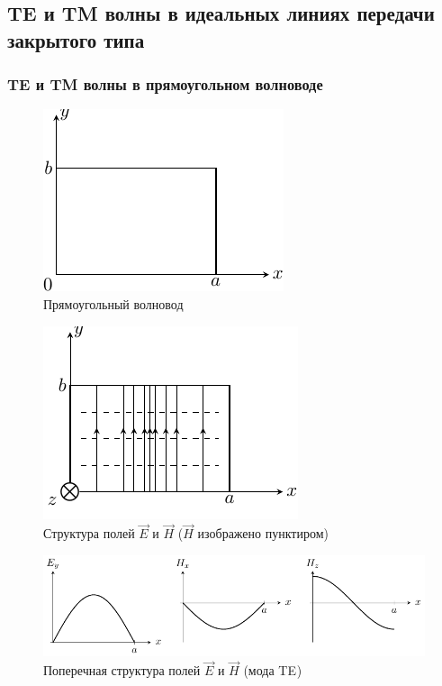 \subsection{TE и TM волны в идеальных линиях передачи закрытого типа}


\subsubsection{TE и TM волны в прямоугольном волноводе}

\begin{figure}[H]
	\centering
	\includegraphics[scale=1.5]{img/lect4_ris7}
	\caption{Прямоугольный волновод}
	\label{fig:lect4:7}
\end{figure}

\begin{figure}[H]
	\centering
	\includegraphics[scale=1.5]{img/lect4_ris8}
	\caption{Структура полей $\vec{E}$ и $\vec{H}$ ($\vec{H}$ изображено пунктиром)}
	\label{fig:lect4:8}
\end{figure}

\begin{figure}[H]
	\centering
	\includegraphics[width=\textwidth]{img/lect4_ris9}
	\caption{Поперечная структура полей $\vec{E}$ и $\vec{H}$ (мода TE$_{}$)}
	\label{fig:lect4:9}
\end{figure}

